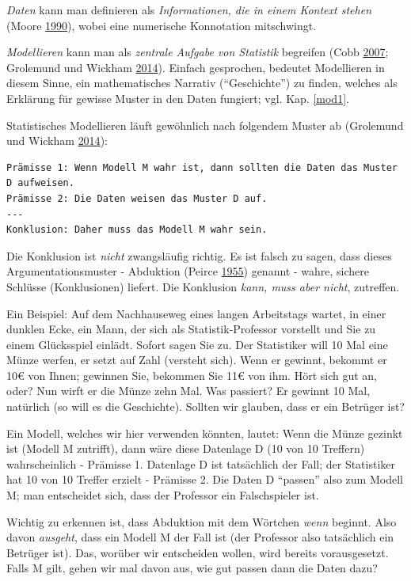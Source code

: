 \documentclass[12pt,ngerman,]{book}
\newcommand{\euro}{€}
\theoremstyle{definition}
\theoremstyle{definition}
\theoremstyle{remark}
\begin{document}
\emph{Daten} kann man definieren als \emph{Informationen, die in einem
Kontext stehen} (Moore
\protect\hyperlink{ref-moore1990uncertainty}{1990}), wobei eine
numerische Konnotation mitschwingt.

\emph{Modellieren} kann man als \emph{zentrale Aufgabe von Statistik}
begreifen (Cobb \protect\hyperlink{ref-cobb2007introductory}{2007};
Grolemund und Wickham
\protect\hyperlink{ref-grolemund2014cognitive}{2014}). Einfach
gesprochen, bedeutet Modellieren in diesem Sinne, ein mathematisches
Narrativ (``Geschichte'') zu finden, welches als Erklärung für gewisse
Muster in den Daten fungiert; vgl. Kap. \ref{mod1}.

Statistisches Modellieren läuft gewöhnlich nach folgendem Muster ab
(Grolemund und Wickham
\protect\hyperlink{ref-grolemund2014cognitive}{2014}):

\begin{verbatim}
Prämisse 1: Wenn Modell M wahr ist, dann sollten die Daten das Muster D aufweisen.
Prämisse 2: Die Daten weisen das Muster D auf.
---
Konklusion: Daher muss das Modell M wahr sein.
\end{verbatim}

Die Konklusion ist \emph{nicht} zwangsläufig richtig. Es ist falsch zu
sagen, dass dieses Argumentationsmuster - Abduktion (Peirce
\protect\hyperlink{ref-peirce1955abduction}{1955}) genannt - wahre,
sichere Schlüsse (Konklusionen) liefert. Die Konklusion \emph{kann, muss
aber nicht}, zutreffen.

Ein Beispiel: Auf dem Nachhauseweg eines langen Arbeitstags wartet, in
einer dunklen Ecke, ein Mann, der sich als Statistik-Professor vorstellt
und Sie zu einem Glücksspiel einlädt. Sofort sagen Sie zu. Der
Statistiker will 10 Mal eine Münze werfen, er setzt auf Zahl (versteht
sich). Wenn er gewinnt, bekommt er 10\euro{} von Ihnen; gewinnen Sie,
bekommen Sie 11\euro{} von ihm. Hört sich gut an, oder? Nun wirft er die
Münze zehn Mal. Was passiert? Er gewinnt 10 Mal, natürlich (so will es
die Geschichte). Sollten wir glauben, dass er ein Betrüger ist?

Ein Modell, welches wir hier verwenden könnten, lautet: Wenn die Münze
gezinkt ist (Modell M zutrifft), dann wäre diese Datenlage D (10 von 10
Treffern) wahrscheinlich - Prämisse 1. Datenlage D ist tatsächlich der
Fall; der Statistiker hat 10 von 10 Treffer erzielt - Prämisse 2. Die
Daten D ``passen'' also zum Modell M; man entscheidet sich, dass der
Professor ein Falschspieler ist.

Wichtig zu erkennen ist, dass Abduktion mit dem Wörtchen \emph{wenn}
beginnt. Also davon \emph{ausgeht}, dass ein Modell M der Fall ist (der
Professor also tatsächlich ein Betrüger ist). Das, worüber wir
entscheiden wollen, wird bereits vorausgesetzt. Falls M gilt, gehen wir
mal davon aus, wie gut passen dann die Daten dazu?
\end{document}
